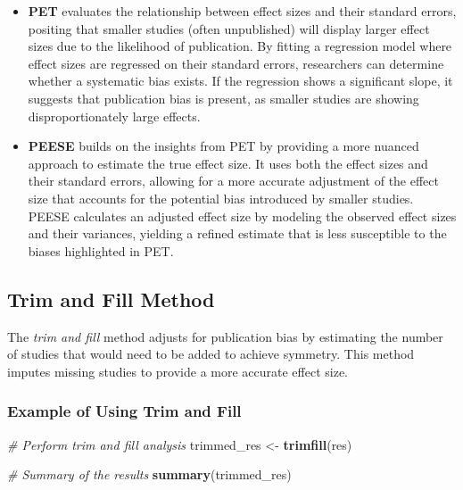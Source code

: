 \documentclass[
]{book}
\newenvironment{Shaded}{\begin{snugshade}}{\end{snugshade}}
\newcommand{\CommentTok}[1]{\textcolor[rgb]{0.56,0.35,0.01}{\textit{#1}}}
\newcommand{\FunctionTok}[1]{\textcolor[rgb]{0.13,0.29,0.53}{\textbf{#1}}}
\newcommand{\NormalTok}[1]{#1}
\newcommand{\OtherTok}[1]{\textcolor[rgb]{0.56,0.35,0.01}{#1}}
\begin{document}
\begin{itemize}
\item
  \textbf{PET} evaluates the relationship between effect sizes and their standard errors, positing that smaller studies (often unpublished) will display larger effect sizes due to the likelihood of publication. By fitting a regression model where effect sizes are regressed on their standard errors, researchers can determine whether a systematic bias exists. If the regression shows a significant slope, it suggests that publication bias is present, as smaller studies are showing disproportionately large effects.
\item
  \textbf{PEESE} builds on the insights from PET by providing a more nuanced approach to estimate the true effect size. It uses both the effect sizes and their standard errors, allowing for a more accurate adjustment of the effect size that accounts for the potential bias introduced by smaller studies. PEESE calculates an adjusted effect size by modeling the observed effect sizes and their variances, yielding a refined estimate that is less susceptible to the biases highlighted in PET.
\end{itemize}

\subsection{Trim and Fill Method}\label{trim-and-fill-method}

The \emph{trim and fill} method adjusts for publication bias by estimating the number of studies that would need to be added to achieve symmetry. This method imputes missing studies to provide a more accurate effect size.

\subsubsection{Example of Using Trim and Fill}\label{example-of-using-trim-and-fill}

\begin{Shaded}
\begin{Highlighting}[]
\CommentTok{\# Perform trim and fill analysis}
\NormalTok{trimmed\_res }\OtherTok{\textless{}{-}} \FunctionTok{trimfill}\NormalTok{(res)}

\CommentTok{\# Summary of the results}
\FunctionTok{summary}\NormalTok{(trimmed\_res)}
\end{Highlighting}
\end{Shaded}
\end{document}
